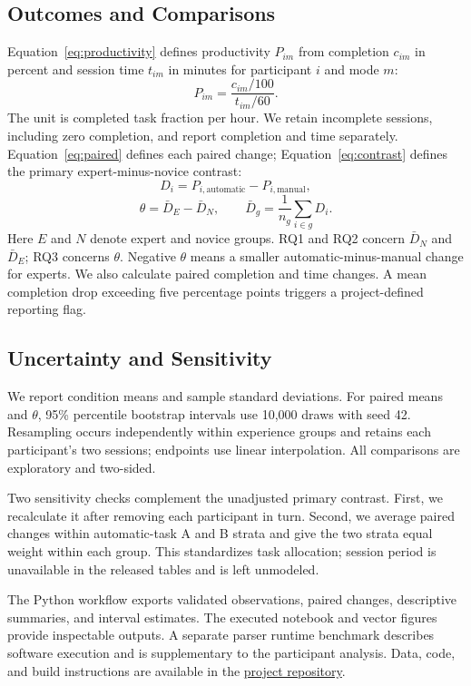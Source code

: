 \subsection{Outcomes and Comparisons}
Equation~\ref{eq:productivity} defines productivity $P_{im}$ from completion
$c_{im}$ in percent and session time $t_{im}$ in minutes for participant $i$
and mode $m$:
\begin{equation}
P_{im}=\frac{c_{im}/100}{t_{im}/60}.
\label{eq:productivity}
\end{equation}
The unit is completed task fraction per hour. We retain incomplete sessions,
including zero completion, and report completion and time separately.
Equation~\ref{eq:paired} defines each paired change; Equation~\ref{eq:contrast}
defines the primary expert-minus-novice contrast:
\begin{equation}
D_i=P_{i,\mathrm{automatic}}-P_{i,\mathrm{manual}},
\label{eq:paired}
\end{equation}
\begin{equation}
\theta=\bar D_E-\bar D_N,\qquad
\bar D_g=\frac{1}{n_g}\sum_{i\in g}D_i.
\label{eq:contrast}
\end{equation}
Here $E$ and $N$ denote expert and novice groups. RQ1 and RQ2 concern
$\bar D_N$ and $\bar D_E$; RQ3 concerns $\theta$. Negative $\theta$ means a
smaller automatic-minus-manual change for experts. We also calculate paired
completion and time changes. A mean completion drop exceeding five percentage
points triggers a project-defined reporting flag.

\subsection{Uncertainty and Sensitivity}
We report condition means and sample standard deviations. For paired means
and $\theta$, 95\% percentile bootstrap intervals use 10,000 draws with seed 42.
Resampling occurs independently within experience groups and retains each
participant's two sessions; endpoints use linear interpolation. All comparisons
are exploratory and two-sided.

Two sensitivity checks complement the unadjusted primary contrast. First, we
recalculate it after removing each participant in turn. Second, we average
paired changes within automatic-task A and B strata and give the two strata
equal weight within each group. This standardizes task allocation; session
period is unavailable in the released tables and is left unmodeled.

The Python workflow exports validated observations, paired changes, descriptive
summaries, and interval estimates. The executed notebook and vector figures
provide inspectable outputs. A separate parser runtime benchmark describes
software execution and is supplementary to the participant analysis.
Data, code, and build instructions are available in the
\href{https://github.com/kirillmehopov-design/research-methods-task2-makhmutov-and-kasimov/tree/task-4}{project repository}.
